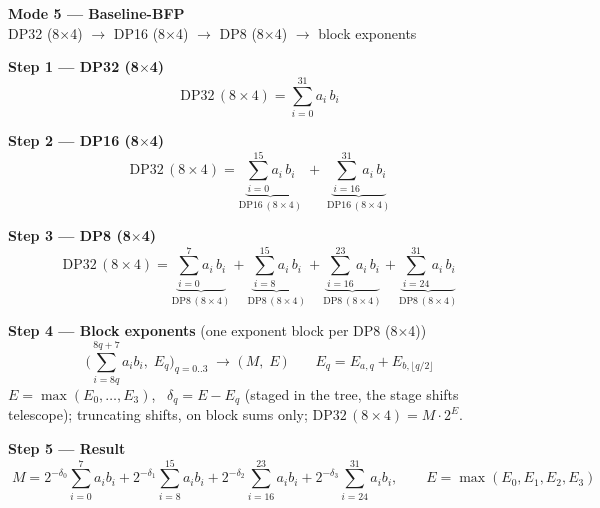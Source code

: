 \documentclass[fleqn]{article}
\newcommand{\DPop}[3]{\mathrm{DP#1}\,(#2\!\times\!#3)}
\begin{document}
\begin{center}
{\LARGE \textbf{Mode 5 --- Baseline-BFP}}\\[4pt]
{\large DP32 (8$\times$4) $\rightarrow$ DP16 (8$\times$4) $\rightarrow$ DP8 (8$\times$4) $\rightarrow$ block exponents}
\end{center}

\vspace{0.5em}

\textbf{Step 1 --- DP32 (8$\times$4)}
\[ \DPop{32}{8}{4} = \sum_{i=0}^{31} a_i \, b_i \]

\vspace{0.5em}

\textbf{Step 2 --- DP16 (8$\times$4)}
\[
\DPop{32}{8}{4}
  = \underbrace{\sum_{i=0}^{15} a_i \, b_i}_{\DPop{16}{8}{4}}
  \; + \; \underbrace{\sum_{i=16}^{31} a_i \, b_i}_{\DPop{16}{8}{4}}
\]

\vspace{0.5em}

\textbf{Step 3 --- DP8 (8$\times$4)}
\[
\DPop{32}{8}{4}
  = \underbrace{\sum_{i=0}^{7} a_i \, b_i}_{\DPop{8}{8}{4}}
  + \underbrace{\sum_{i=8}^{15} a_i \, b_i}_{\DPop{8}{8}{4}}
  + \underbrace{\sum_{i=16}^{23} a_i \, b_i}_{\DPop{8}{8}{4}}
  + \underbrace{\sum_{i=24}^{31} a_i \, b_i}_{\DPop{8}{8}{4}}
\]

\vspace{0.5em}

\textbf{Step 4 --- Block exponents}\quad
{\small(one exponent block per DP8 (8$\times$4))}
\[
\Big(\sum_{i=8q}^{8q+7} a_i b_i,\; E_q\Big)_{q=0..3}
\;\longrightarrow\;
\Big(\, M ,\; E \,\Big)
\qquad
E_q = E_{a,q} + E_{b,\lfloor q/2\rfloor}
\]
$E=\max(E_0,\dots,E_3)$, \ $\delta_q=E-E_q$ (staged in the tree, the stage shifts telescope); \quad truncating shifts, on block sums only; \quad $\DPop{32}{8}{4}=M\cdot2^{E}$.

\vspace{0.5em}

\textbf{Step 5 --- Result}
\[
\boxed{\;
M = 2^{-\delta_0}\!\sum_{i=0}^{7} a_i b_i
  + 2^{-\delta_1}\!\sum_{i=8}^{15} a_i b_i
  + 2^{-\delta_2}\!\sum_{i=16}^{23} a_i b_i
  + 2^{-\delta_3}\!\sum_{i=24}^{31} a_i b_i,
\qquad E = \max(E_0,E_1,E_2,E_3)
\;}
\]
\end{document}
